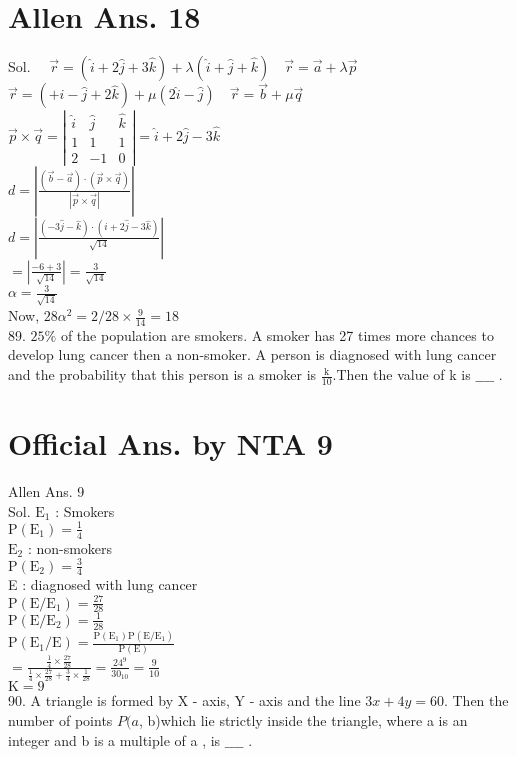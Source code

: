 \documentclass[10pt]{article}
\begin{document}
\section*{Allen Ans. 18}
Sol. \(\quad \vec{r}=(\hat{i}+2 \hat{j}+3 \hat{k})+\lambda(\hat{i}+\hat{j}+\hat{k}) \quad \vec{r}=\vec{a}+\lambda \vec{p}\)\\
\(\vec{r}=(+\hat{i}-\hat{j}+2 \hat{k})+\mu(2 \hat{i}-\hat{j}) \quad \vec{r}=\vec{b}+\mu \vec{q}\)\\
\(\vec{p} \times \vec{q}=\left|\begin{array}{ccc}\hat{i} & \hat{j} & \hat{k} \\ 1 & 1 & 1 \\ 2 & -1 & 0\end{array}\right|=\hat{i}+2 \hat{j}-3 \hat{k}\)\\
\(d=\left|\frac{(\vec{b}-\vec{a}) \cdot(\vec{p} \times \vec{q})}{|\vec{p} \times \vec{q}|}\right|\)\\
\(d=\left|\frac{(-3 \hat{j}-\hat{k}) \cdot(\hat{i}+2 \hat{j}-3 \hat{k})}{\sqrt{14}}\right|\)\\
\(=\left|\frac{-6+3}{\sqrt{14}}\right|=\frac{3}{\sqrt{14}}\)\\
\(\alpha=\frac{3}{\sqrt{14}}\)\\
Now, \(28 \alpha^{2}=2 / 28 \times \frac{9}{14}=18\)\\
89. \(25 \%\) of the population are smokers. A smoker has 27 times more chances to develop lung cancer then a non-smoker. A person is diagnosed with lung cancer and the probability that this person is a smoker is \(\frac{\mathrm{k}}{10}\).Then the value of k is \(\_\_\_\_\) .

\section*{Official Ans. by NTA 9}
Allen Ans. 9\\
Sol. \(\mathrm{E}_{1}\) : Smokers\\
\(\mathrm{P}\left(\mathrm{E}_{1}\right)=\frac{1}{4}\)\\
\(\mathrm{E}_{2}\) : non-smokers\\
\(\mathrm{P}\left(\mathrm{E}_{2}\right)=\frac{3}{4}\)\\
E : diagnosed with lung cancer\\
\(\mathrm{P}\left(\mathrm{E} / \mathrm{E}_{1}\right)=\frac{27}{28}\)\\
\(\mathrm{P}\left(\mathrm{E} / \mathrm{E}_{2}\right)=\frac{1}{28}\)\\
\(\mathrm{P}\left(\mathrm{E}_{1} / \mathrm{E}\right)=\frac{\mathrm{P}\left(\mathrm{E}_{1}\right) \mathrm{P}\left(\mathrm{E} / \mathrm{E}_{1}\right)}{\mathrm{P}(\mathrm{E})}\)\\
\(=\frac{\frac{1}{4} \times \frac{27}{28}}{\frac{1}{4} \times \frac{27}{28}+\frac{3}{4} \times \frac{1}{28}}=\frac{24^{9}}{30_{10}}=\frac{9}{10}\)\\
\(\mathrm{K}=9\)\\
90. A triangle is formed by X - axis, Y - axis and the line \(3 x+4 y=60\). Then the number of points \(P(a\), b)which lie strictly inside the triangle, where a is an integer and b is a multiple of a , is \(\_\_\_\_\) .
\end{document}
